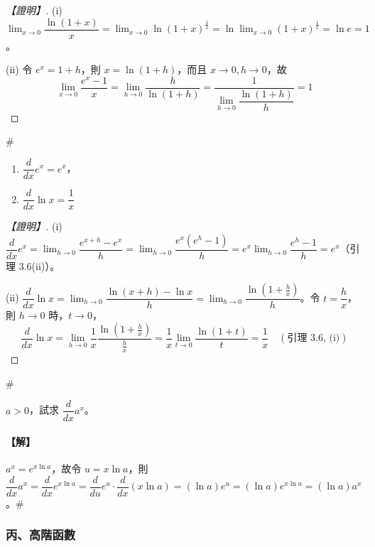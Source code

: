 \begin{proof}[【證明】]
(i) $\lim_{x\to 0}\dfrac{\ln(1+x)}{x} = \lim_{x\to 0}\ln(1+x)^{\frac{1}{x}} = \ln\lim_{x\to 0}(1+x)^{\frac{1}{x}} = \ln e = 1$。

(ii) 令 $e^x = 1+h$，則 $x=\ln(1+h)$，而且 $x\longrightarrow 0, h\longrightarrow 0$，故
\[ \lim_{x\to 0}\dfrac{e^x-1}{x} = \lim_{h\to 0}\dfrac{h}{\ln(1+h)} = \dfrac{1}{\lim_{h\to 0}\dfrac{\ln(1+h)}{h}} = 1 \]
\end{proof}\hfill$\#$

\setcounter{theorem}{6}
\begin{theorem}\label{thm:b6-app4-deriv-exp-ln}
\begin{enumerate}[label=(\roman*), leftmargin=2em]
  \item $\dfrac{d}{dx}e^x = e^x$，
  \item $\dfrac{d}{dx}\ln x = \dfrac{1}{x}$
\end{enumerate}
\end{theorem}

\begin{proof}[【證明】]
(i) $\dfrac{d}{dx}e^x = \lim_{h\to 0}\dfrac{e^{x+h}-e^x}{h} = \lim_{h\to 0}\dfrac{e^x(e^h-1)}{h} = e^x\lim_{h\to 0}\dfrac{e^h-1}{h} = e^x$（引理 3.6(ii)）。

(ii) $\dfrac{d}{dx}\ln x = \lim_{h\to 0}\dfrac{\ln(x+h)-\ln x}{h} = \lim_{h\to 0}\dfrac{\ln\left(1+\frac{h}{x}\right)}{h}$。令 $t=\dfrac{h}{x}$，則 $h\longrightarrow 0$ 時，$t\longrightarrow 0$，
\[ \dfrac{d}{dx}\ln x = \lim_{h\to 0}\dfrac{1}{x}\dfrac{\ln\left(1+\frac{h}{x}\right)}{\frac{h}{x}} = \dfrac{1}{x}\lim_{t\to 0}\dfrac{\ln(1+t)}{t} = \dfrac{1}{x} \quad (\text{引理 3.6, (i)}) \]
\end{proof}\hfill$\#$

\begin{example}\label{ex:b6-app4-14}
$a>0$，試求 $\dfrac{d}{dx} a^x$。
\end{example}

\paragraph{【解】}
$a^x = e^{x\ln a}$，故令 $u=x\ln a$，則 $\dfrac{d}{dx}a^x = \dfrac{d}{dx}e^{x\ln a} = \dfrac{d}{du}e^u \cdot \dfrac{d}{dx}(x\ln a) = (\ln a)e^u = (\ln a)e^{x\ln a} = (\ln a)a^x$。\hfill$\#$

\subsubsection*{丙、高階函數}

